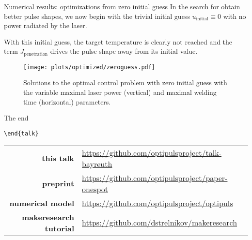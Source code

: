 \documentclass[
	9pt,
	hyperref = {unicode,pdfpagelabels=false},
	notheorems,
	aspectratio=169
	]{beamer}
\begin{document}
\begin{frame}{Numerical results: optimizations from zero initial guess}
	In the search for obtain better pulse shapes, we now begin with the trivial initial guess $u_\text{initial} \equiv 0$ with no power radiated by the laser.

	With this initial guess, the target temperature is clearly not reached and the term $J_\text{penetration}$ drives the pulse shape away from its initial value.
	
	\begin{table}
		\centering
		
		\caption{Numerical report on the series of optimizations with zero initial guess.}
		\label{tab:zeroguess}
	\end{table}
\end{frame}


\begin{frame}
	\vspace{-0.75em}
	\begin{figure}
		\centering
		\texttt{[image: plots/optimized/zeroguess.pdf]}
		\vspace{-1.0em}
		\caption{Solutions to the optimal control problem with zero initial guess with the variable maximal laser power (vertical) and maximal welding time (horizontal) parameters.}
		\label{fig:zeroguess}
	\end{figure}
\end{frame}


\begin{frame}{The end}
	\begin{center}
		\texttt{{\textbackslash}end\{talk\}}\\[1em]
		\vfill
		\begin{tabular}{rl}
			\textbf{this talk} & \url{https://github.com/optipulsproject/talk-bayreuth} \\
			\textbf{preprint} & \url{https://github.com/optipulsproject/paper-onespot} \\
			\textbf{numerical model} & \url{https://github.com/optipulsproject/optipuls} \\
			\textbf{makeresearch tutorial} & \url{https://github.com/dstrelnikov/makeresearch}
		\end{tabular}
	\end{center}
\end{frame}
\end{document}
